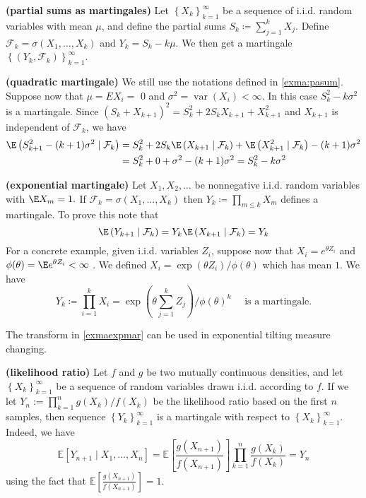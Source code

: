 \documentclass{article}
\newcommand{\bfs}[1]{\textbf{({#1})}}
\begin{document}
\begin{exma}{\bfs{partial sums as martingales}}\label{exma:pasum}
Let $\left\{X_{k}\right\}_{k=1}^{\infty}$ be a sequence of i.i.d. random variables with mean $\mu$, and define the partial sums $S_{k}\coloneqq \sum_{j=1}^{k} X_{j} .$ Define $\mathcal{F}_{k}=\sigma\left(X_{1}, \ldots, X_{k}\right)$ and $Y_k=S_k-k\mu$. We then get a martingale $\left\{\left(Y_{k}, \mathcal{F}_{k}\right)\right\}_{k=1}^{\infty}$.
\end{exma}

\begin{exma}{\bfs{quadratic martingale}} We still use the notations defined in \cref{exma:pasum}.
Suppose now that $\mu=E X_{i}=$ 0 and $\sigma^{2}=\operatorname{var}\left(X_{i}\right)<\infty$. In this case $S_{k}^{2}-k \sigma^{2}$ is a martingale. Since $\left(S_{k}+X_{k+1}\right)^{2}=S_{k}^{2}+2 S_{k} X_{k+1}+X_{k+1}^{2}$ and $X_{k+1}$ is independent of $\mathcal{F}_{k}$,
we have
$$
\begin{aligned}
\E\left(S_{k+1}^{2}-(k+1) \sigma^{2} \mid \mathcal{F}_{k}\right) &=S_{k}^{2}+2 S_{k} \E\left(X_{k+1} \mid \mathcal{F}_{k}\right)+\E\left(X_{k+1}^{2} \mid \mathcal{F}_{k}\right)-(k+1) \sigma^{2} \\
&=S_{k}^{2}+0+\sigma^{2}-(k+1) \sigma^{2}=S_{k}^{2}-k \sigma^{2}
\end{aligned}
$$
\end{exma} 
\begin{exma}{\bfs{exponential martingale}}\label{exmaexpmar}
Let $X_{1}, X_{2}, \ldots$ be nonnegative i.i.d. random variables with $\E X_{m}=1 .$ If $\mathcal{F}_{k}=\sigma\left(X_{1}, \ldots, X_{k}\right)$ then $Y_{k}\coloneqq\prod_{m \leq k} X_{m}$ defines a martingale. To prove this note that
$$
\E\left(Y_{k+1} \mid \mathcal{F}_{k}\right)=Y_{k} \E\left(X_{k+1} \mid \mathcal{F}_{k}\right)=Y_{k}
$$
For a concrete example, given  i.i.d. variables $Z_i$, suppose now that $X_{i}=e^{\theta Z_{i}}$ and $\phi(\theta)=\E e^{\theta Z_{i}}<\infty$ . We defined $X_{i}=\exp \left(\theta Z_{i}\right) / \phi(\theta)$
which has mean $1$. We have 
$$Y_{k}\coloneqq\prod_{i=1}^{k} X_{i}=\exp \left(\theta \sum_{j=1}^k Z_{j}\right) / \phi(\theta)^{k} \quad \text{ is a martingale.}$$
\end{exma} 
\begin{rema}
The transform in \cref{exmaexpmar} can be used in exponential tilting measure changing.
\end{rema}
\begin{exma}{\bfs{likelihood ratio}}
Let $f$ and $g$ be two mutually continuous densities, and let $\left\{X_{k}\right\}_{k=1}^{\infty}$ be a sequence of random variables drawn i.i.d. according to $f .$ If we let $Y_{n}:=\prod_{k=1}^{n} g\left(X_{k}\right) / f\left(X_{k}\right)$ be the likelihood ratio based on the first $n$ samples, then sequence $\left\{Y_{k}\right\}_{k=1}^{\infty}$ is a martingale with respect to $\left\{X_{k}\right\}_{k=1}^{\infty} .$ Indeed, we have
$$
\mathbb{E}\left[Y_{n+1} \mid X_{1}, \ldots, X_{n}\right]=\mathbb{E}\left[\frac{g\left(X_{n+1}\right)}{f\left(X_{n+1}\right)}\right] \prod_{k=1}^{n} \frac{g\left(X_{k}\right)}{f\left(X_{k}\right)}=Y_{n}
$$
using the fact that $\mathbb{E}\left[\frac{g\left(X_{n+1}\right)}{f\left(X_{n+1}\right)}\right]=1$.
\end{exma}
\end{document}
